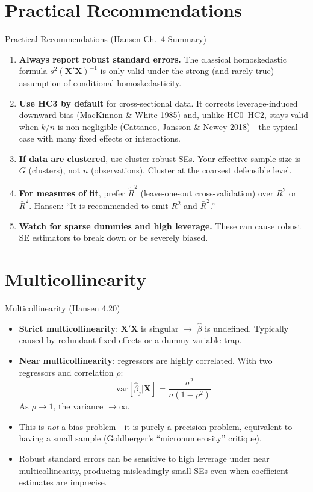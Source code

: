 \documentclass[aspectratio=169, handout, t]{beamer}
\numberwithin{equation}{section}
\begin{document}
 \section{Practical Recommendations}

\begin{frame}{Practical Recommendations (Hansen Ch.\ 4 Summary)}
\begin{enumerate}
\item \textbf{Always report robust standard errors.}  The classical homoskedastic formula $s^2(\bm{X'X})^{-1}$ is only valid under the strong (and rarely true) assumption of conditional homoskedasticity. \pause
\item \textbf{Use HC3 by default} for cross-sectional data.  It corrects leverage-induced downward bias (MacKinnon \& White 1985) and, unlike HC0--HC2, stays valid when $k/n$ is non-negligible (Cattaneo, Jansson \& Newey 2018)---the typical case with many fixed effects or interactions. \pause
\item \textbf{If data are clustered}, use cluster-robust SEs.  Your effective sample size is $G$ (clusters), not $n$ (observations).  Cluster at the coarsest defensible level. \pause
\item \textbf{For measures of fit}, prefer $\tilde{R}^2$ (leave-one-out cross-validation) over $R^2$ or $\bar{R}^2$.  Hansen:  ``It is recommended to omit $R^2$ and $\bar{R}^2$.'' \pause
\item \textbf{Watch for sparse dummies and high leverage.}  These can cause robust SE estimators to break down or be severely biased.
\end{enumerate}
\end{frame}

 \section{Multicollinearity}
 
 \begin{frame}{Multicollinearity (Hansen 4.20)}
\begin{itemize}
\item \textbf{Strict multicollinearity}: $\bm{X'\!X}$ is singular $\rightarrow$ $\hat{\beta}$ is undefined.  Typically caused by redundant fixed effects or a dummy variable trap. \pause
\item \textbf{Near multicollinearity}: regressors are highly correlated.  With two regressors and correlation $\rho$:
$$\text{var}[\hat{\beta}_j|\bm{X}]=\frac{\sigma^2}{n(1-\rho^2)}$$
As $\rho\to 1$, the variance $\to\infty$.  \pause
\item This is \emph{not} a bias problem---it is purely a precision problem, equivalent to having a small sample (Goldberger's ``micronumerosity'' critique). \pause
\item Robust standard errors can be \alert{sensitive to high leverage} under near multicollinearity, producing misleadingly small SEs even when coefficient estimates are imprecise.
\end{itemize}
 \end{frame}
\end{document}
